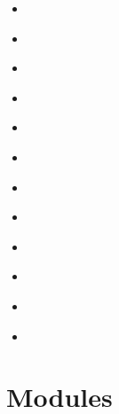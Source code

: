 \documentclass[letterpaper,10pt,english]{sphinxmanual}
\begin{document}
\label{\detokenize{modindex:module-index}}\label{\detokenize{modindex::doc}}\begin{itemize}
\item {} 
\sphinxAtStartPar
{\hyperref[\detokenize{mods:emu}]{}}

\item {} 
\sphinxAtStartPar
{\hyperref[\detokenize{mods:gui}]{}}

\item {} 
\sphinxAtStartPar
{\hyperref[\detokenize{mods:stylus}]{}}

\item {} 
\sphinxAtStartPar
{\hyperref[\detokenize{mods:savestate}]{}}

\item {} 
\sphinxAtStartPar
{\hyperref[\detokenize{mods:memory}]{}}

\item {} 
\sphinxAtStartPar
{\hyperref[\detokenize{mods:joypad}]{}}

\item {} 
\sphinxAtStartPar
{\hyperref[\detokenize{mods:input}]{}}

\item {} 
\sphinxAtStartPar
{\hyperref[\detokenize{mods:movie}]{}}

\item {} 
\sphinxAtStartPar
{\hyperref[\detokenize{mods:sound}]{}}

\item {} 
\sphinxAtStartPar
{\hyperref[\detokenize{mods:bit}]{}}

\item {} 
\sphinxAtStartPar
{\hyperref[\detokenize{mods:agg}]{}}

\item {} 
\sphinxAtStartPar
{\hyperref[\detokenize{mods:controller}]{}}

\end{itemize}


\section{Modules}
\label{\detokenize{mods:modules}}\label{\detokenize{mods::doc}}
\end{document}
